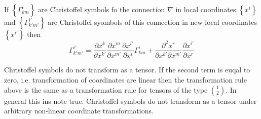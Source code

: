 If $\left\lbrace \Gamma_{km}^{i}\right\rbrace$
 are Christoffel symbols fo the connection $\nabla$ in local coordinates $\left\lbrace x^i\right\rbrace$
and $\left\lbrace \Gamma_{k'm'}^{i'}\right\rbrace$ are Christoffel syombols of this connection in new local coordinates
$\left\lbrace x^{i'}\right\rbrace$ then
\begin{equation}\label{2.11}
 \Gamma_{k'm'}^{i'} = \dfrac{\partial x^{k}}{\partial x^{k'}}\dfrac{\partial x^{m}}{\partial x^{m'}}
 \dfrac{\partial x^{i'}}{\partial x^{i}}\Gamma_{km}^{i}
 + \dfrac{\partial^{2} x^{r}}{\partial x^{k'}\partial x^{m'}} \dfrac{\partial x^{i'}}{\partial x^{r}}
\end{equation}
\begin{remark}
 Christoffel symbols do not transform as a tensor. If the second term is euqal to zero, i.e. transformation 
 of coordinates are linear then the transformation rule above is the same as a transformation rule for tensors
 of the type  $\binom{1}{2}$. In general this ins note true. Christoffel symbols do not transform as a tensor under
 arbitrary non-linear coordinate transformations.
\end{remark}

